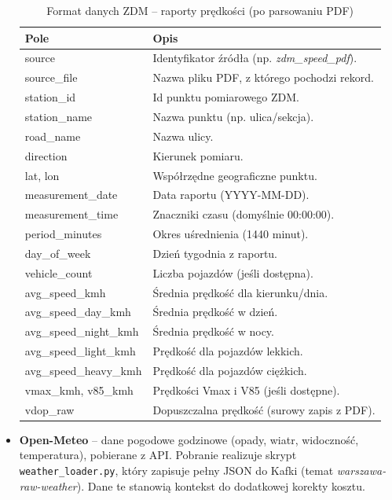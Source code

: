 \documentclass[12pt]{article}
\begin{document}
\begin{itemize}
    \begin{table}[H]
        \centering
        \caption{Format danych ZDM -- raporty prędkości (po parsowaniu PDF)}
        \label{tab:zdm-speed-format}
        \begin{tabular}{|l|p{10cm}|}
            \hline
            \textbf{Pole} & \textbf{Opis} \\ \hline
            source & Identyfikator źródła (np. \textit{zdm\_speed\_pdf}). \\ \hline
            source\_file & Nazwa pliku PDF, z którego pochodzi rekord. \\ \hline
            station\_id & Id punktu pomiarowego ZDM. \\ \hline
            station\_name & Nazwa punktu (np. ulica/sekcja). \\ \hline
            road\_name & Nazwa ulicy. \\ \hline
            direction & Kierunek pomiaru. \\ \hline
            lat, lon & Współrzędne geograficzne punktu. \\ \hline
            measurement\_date & Data raportu (YYYY-MM-DD). \\ \hline
            measurement\_time & Znaczniki czasu (domyślnie 00:00:00). \\ \hline
            period\_minutes & Okres uśrednienia (1440 minut). \\ \hline
            day\_of\_week & Dzień tygodnia z raportu. \\ \hline
            vehicle\_count & Liczba pojazdów (jeśli dostępna). \\ \hline
            avg\_speed\_kmh & Średnia prędkość dla kierunku/dnia. \\ \hline
            avg\_speed\_day\_kmh & Średnia prędkość w dzień. \\ \hline
            avg\_speed\_night\_kmh & Średnia prędkość w nocy. \\ \hline
            avg\_speed\_light\_kmh & Prędkość dla pojazdów lekkich. \\ \hline
            avg\_speed\_heavy\_kmh & Prędkość dla pojazdów ciężkich. \\ \hline
            vmax\_kmh, v85\_kmh & Prędkości Vmax i V85 (jeśli dostępne). \\ \hline
            vdop\_raw & Dopuszczalna prędkość (surowy zapis z PDF). \\ \hline
        \end{tabular}
    \end{table}
        \item \textbf{Open-Meteo} -- dane pogodowe godzinowe (opady, wiatr, widoczność, temperatura),
        pobierane z API. Pobranie realizuje skrypt
        \verb|weather_loader.py|, który zapisuje pełny JSON do Kafki
        (temat \textit{warszawa-raw-weather}). Dane te stanowią kontekst do dodatkowej korekty kosztu.


\end{itemize}
\end{document}
